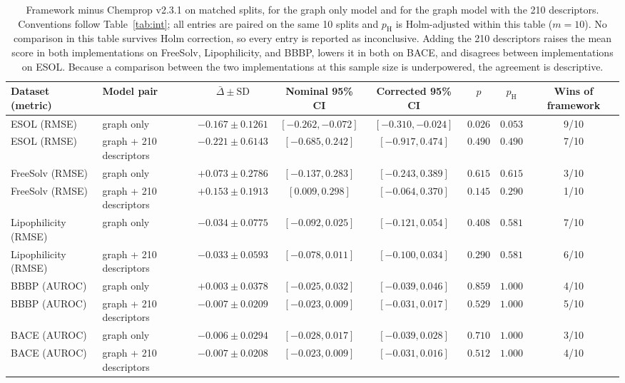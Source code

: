 \begin{table}[H]
\caption{Framework minus Chemprop v2.3.1 on matched splits, for the graph only model and for the graph model with the 210 descriptors. Conventions follow Table~\ref{tab:int}; all entries are paired on the same 10 splits and $p_{\mathrm{H}}$ is Holm-adjusted within this table ($m=10$). No comparison in this table survives Holm correction, so every entry is reported as inconclusive. Adding the 210 descriptors raises the mean score in both implementations on FreeSolv, Lipophilicity, and BBBP, lowers it in both on BACE, and disagrees between implementations on ESOL. Because a comparison between the two implementations at this sample size is underpowered, the agreement is descriptive.}\label{tab:ext}
\centering\scriptsize
\setlength{\tabcolsep}{2pt}
\begin{tabular}{@{}llcccccc@{}}
\toprule
Dataset (metric) & Model pair & $\bar\Delta\pm\mathrm{SD}$ & Nominal 95\% CI & Corrected 95\% CI & $p$ & $p_{\mathrm{H}}$ & Wins of framework \\
\midrule
ESOL (RMSE) & graph only & $-0.167\pm0.1261$ & $[-0.262,-0.072]$ & $[-0.310,-0.024]$ & $0.026$ & $0.053$ & 9/10 \\
ESOL (RMSE) & graph + 210 descriptors & $-0.221\pm0.6143$ & $[-0.685,0.242]$ & $[-0.917,0.474]$ & $0.490$ & $0.490$ & 7/10 \\
FreeSolv (RMSE) & graph only & $+0.073\pm0.2786$ & $[-0.137,0.283]$ & $[-0.243,0.389]$ & $0.615$ & $0.615$ & 3/10 \\
FreeSolv (RMSE) & graph + 210 descriptors & $+0.153\pm0.1913$ & $[0.009,0.298]$ & $[-0.064,0.370]$ & $0.145$ & $0.290$ & 1/10 \\
Lipophilicity (RMSE) & graph only & $-0.034\pm0.0775$ & $[-0.092,0.025]$ & $[-0.121,0.054]$ & $0.408$ & $0.581$ & 7/10 \\
Lipophilicity (RMSE) & graph + 210 descriptors & $-0.033\pm0.0593$ & $[-0.078,0.011]$ & $[-0.100,0.034]$ & $0.290$ & $0.581$ & 6/10 \\
BBBP (AUROC) & graph only & $+0.003\pm0.0378$ & $[-0.025,0.032]$ & $[-0.039,0.046]$ & $0.859$ & $1.000$ & 4/10 \\
BBBP (AUROC) & graph + 210 descriptors & $-0.007\pm0.0209$ & $[-0.023,0.009]$ & $[-0.031,0.017]$ & $0.529$ & $1.000$ & 5/10 \\
BACE (AUROC) & graph only & $-0.006\pm0.0294$ & $[-0.028,0.017]$ & $[-0.039,0.028]$ & $0.710$ & $1.000$ & 3/10 \\
BACE (AUROC) & graph + 210 descriptors & $-0.007\pm0.0208$ & $[-0.023,0.009]$ & $[-0.031,0.016]$ & $0.512$ & $1.000$ & 4/10 \\
\bottomrule
\end{tabular}
\end{table}
